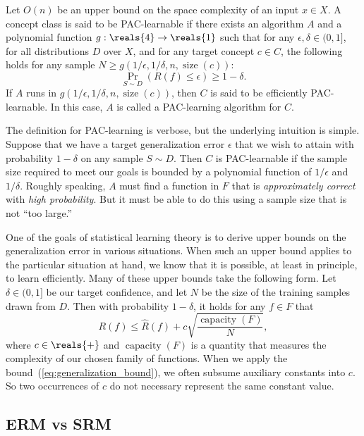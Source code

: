 \documentclass[11pt,a4paper]{article}
\numberwithin{equation}{section}
\newcommand{\size}{\operatorname{size}}
\newcommand{\capacity}{\operatorname{capacity}}
\begin{document}
\begin{definition}
Let $O(n)$ be an upper bound on the space complexity of an input $x \in X$. A
concept class is said to be PAC-learnable if there exists an algorithm $A$ and a
polynomial function $g : \reals{4} \to \reals{1}$ such that for any $\epsilon,
\delta \in (0, 1]$, for all distributions $D$ over $X$, and for any target
concept $c \in C$, the following holds for any sample $N \geq g(1/\epsilon,
1/\delta, n, \size(c))$:
\[
	\Pr_{S \sim D} (R(f) \leq \epsilon) \geq 1 - \delta.
\]
If $A$ runs in $g(1/\epsilon, 1/\delta, n, \size(c))$, then $C$ is said to be
efficiently PAC-learnable. In this case, $A$ is called a PAC-learning algorithm
for $C$.
\end{definition}

The definition for PAC-learning is verbose, but the underlying intuition is
simple. Suppose that we have a target generalization error $\epsilon$ that we
wish to attain with probability $1 - \delta$ on any sample $S \sim D$. Then $C$
is PAC-learnable if the sample size required to meet our goals is bounded by a
polynomial function of $1/\epsilon$ and $1/\delta$. Roughly speaking, $A$ must
find a function in $F$ that is \emph{approximately correct} with \emph{high
probability}. But it must be able to do this using a sample size that is not
``too large.''

One of the goals of statistical learning theory is to derive upper bounds on the
generalization error in various situations. When such an upper bound applies to
the particular situation at hand, we know that it is possible, at least in
principle, to learn efficiently. Many of these upper bounds take the following
form. Let $\delta \in (0, 1]$ be our target confidence, and let $N$ be the size
of the training samples drawn from $D$. Then with probability $1 - \delta$, it
holds for any $f \in F$ that
\begin{equation}
	R(f) \leq \hat{R}(f) + c \sqrt{\frac{\capacity(F)}{N}},
	\label{eq:generalization_bound}
\end{equation}
where $c \in \reals{+}$ and $\capacity(F)$ is a quantity that measures the
complexity of our chosen family of functions. When we apply the
bound~(\ref{eq:generalization_bound}), we often subsume auxiliary constants into
$c$. So two occurrences of $c$ do not necessary represent the same constant
value.

\subsection{ERM vs SRM}
\end{document}
